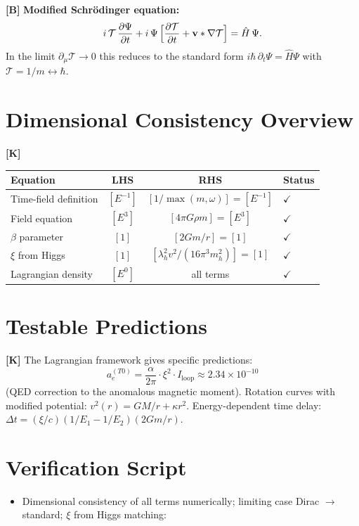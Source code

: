 \textbf{[B]} \textbf{Modified Schrödinger equation:}
\[
  i\,\mathcal T\,\frac{\partial\Psi}{\partial t}
  + i\,\Psi\,\Bigl[\frac{\partial\mathcal T}{\partial t}
  + \mathbf v\cdot\nabla\mathcal T\Bigr]
  = \hat H\,\Psi.
\]
In the limit $\partial_\mu\mathcal T\to0$ this reduces to the standard form
$i\hbar\,\partial_t\Psi=\hat H\Psi$ with $\mathcal T=1/m\leftrightarrow\hbar$.

\section{Dimensional Consistency Overview}

\textbf{[K]}
\begin{center}
\renewcommand{\arraystretch}{1.3}
{\small
\begin{tabular}{lccl}
\toprule
Equation & LHS & RHS & Status \\
\midrule
Time-field definition & $[E^{-1}]$ & $[1/\max(m,\omega)]=[E^{-1}]$ & $\checkmark$ \\
Field equation & $[E^3]$ & $[4\pi G\rho m]=[E^3]$ & $\checkmark$ \\
$\beta$ parameter & $[1]$ & $[2Gm/r]=[1]$ & $\checkmark$ \\
$\xi$ from Higgs & $[1]$ & $[\lambda_h^2 v^2/(16\pi^3 m_h^2)]=[1]$ & $\checkmark$ \\
Lagrangian density & $[E^0]$ & all terms & $\checkmark$ \\
\bottomrule
\end{tabular}
}
\renewcommand{\arraystretch}{1.0}
\end{center}

\section{Testable Predictions}

\textbf{[K]} The Lagrangian framework gives specific predictions:
\[
  a_e^{(T0)} = \frac\alpha{2\pi}\cdot\xi^2\cdot I_\text{loop}
  \approx 2{.}34\times10^{-10}
\]
(QED correction to the anomalous magnetic moment). Rotation curves with modified
potential: $v^2(r)=GM/r+\kappa r^2$. Energy-dependent time delay:
$\Delta t=(\xi/c)(1/E_1-1/E_2)(2Gm/r)$.

\section{Verification Script}

\begin{itemize}[leftmargin=2em,itemsep=2pt,topsep=2pt]
  \item Dimensional consistency of all terms numerically; limiting case Dirac
    $\to$ standard; $\xi$ from Higgs matching:
\end{itemize}

